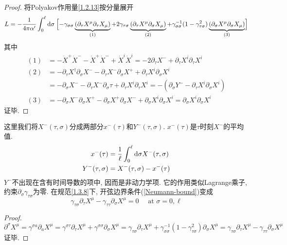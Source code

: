 \begin{proof}
将Polyakov作用量\eqref{1.2.13}按分量展开
\begin{align*}
L=-\frac{1}{4 \pi \alpha^{\prime}} \int_{0}^{\ell} \mathrm{d}\sigma \:\Bigl[-\gamma_{\sigma \sigma}\underbrace{(\partial_\tau X^{\mu} \partial_\tau X_{\mu})}_{(1)} 
+2 \gamma_{\tau \sigma}\underbrace{(\partial_{\tau} X^{\mu} \partial_{\sigma} X_{\mu})}_{(2)} 
+\gamma_{\sigma \sigma}^{-1}(1-\gamma_{\tau \sigma}^{2}) \underbrace{(\partial_{\sigma} X^{\mu} \partial_{\sigma} X_{\mu})}_{(3)}\Bigr]
\end{align*}
其中
\begin{align*}
(1) &=-\dot{X}^{+} \dot{X}^{-}-\dot{X}^{+} \dot{X}^{-}+\dot{X}^{i} \dot{X}^{i} =-2 \partial_{\tau} X^{-}+\partial_{\tau} X^{i} \partial_{\tau} X^{i} \\
(2) &=-\partial_{\tau} X^{\dagger} \partial_{\sigma} X^{-}-\partial_{\tau} X^{-} \partial_{\sigma} X^{+}+\partial_{\tau} X^{i} \partial_{\sigma} X^{i} \\
&=-\partial_{\sigma} X^{-}-\partial_{\tau} X^{-} \partial_{\sigma} \tau+\partial_{\tau} X^{i} \partial_{\tau} X^{i} =-\left(\partial_{\sigma} Y^{-}-\partial_{\tau} X^{i} \partial_{\sigma} X^{i}\right) \\
(3) &=-\partial_{\sigma} X^{-} \partial_{\sigma} X^{+}-\partial_{\sigma} X^{+} \partial_{\sigma} X^{-}+\partial_{\sigma} X^{i} \partial_{\sigma}X^{i} 
=\partial_{\sigma} X^{i} \partial_{\sigma} X^{i}
\end{align*}
证毕.
\end{proof}
\noindent 这里我们将$X^-(\tau,\sigma)$分成两部分$x^-(\tau)$和$Y^-(\tau,\sigma)$. $x^-(\tau)$是$\tau$时刻$X^-$的平均值. 
\begin{subequations}
\begin{align}
x^{-}(\tau)&=\frac{1}{\ell} \int_{0}^{\ell} \mathrm{d} \sigma X^{-}(\tau, \sigma) \\
Y^{-}(\tau, \sigma)&=X^{-}(\tau, \sigma)-x^{-}(\tau)
\end{align}
\end{subequations}
$Y^-$不出现在含有时间导数的项中, 因而是非动力学项. 它的作用类似Lagrange乘子, 约束$\partial_\sigma\gamma_{\tau\sigma}$为零. 
在规范\eqref{1.3.8}下, 开弦边界条件(\ref{Neumann-bound})变成
\begin{equation}
\gamma_{\tau \sigma} \partial_{\tau} X^{\mu}-\gamma_{\tau \tau} \partial_{\sigma} X^{\mu}=0 \quad \text { at } \sigma=0, \ell
\end{equation}
\begin{proof}
$
\partial^{\sigma} X^{\mu} =\gamma^{\sigma a} \partial_{a} X^{\mu}=\gamma^{\sigma \tau} \partial_{\tau} X^{\mu}+\gamma^{\sigma \sigma} \partial_{\sigma} X^{\mu} =\gamma_{\tau \sigma} \partial_{\tau} X^{\mu}+\gamma_{\sigma \sigma}^{-1}\left(1-\gamma_{\tau \sigma}^{2}\right) \partial_{\sigma} X^{\mu} =\gamma_{\tau \sigma} \partial_{\tau} X^{\mu}-\gamma_{\tau \tau} \partial_{\sigma} X^{\mu}
$
证毕. 
\end{proof}
